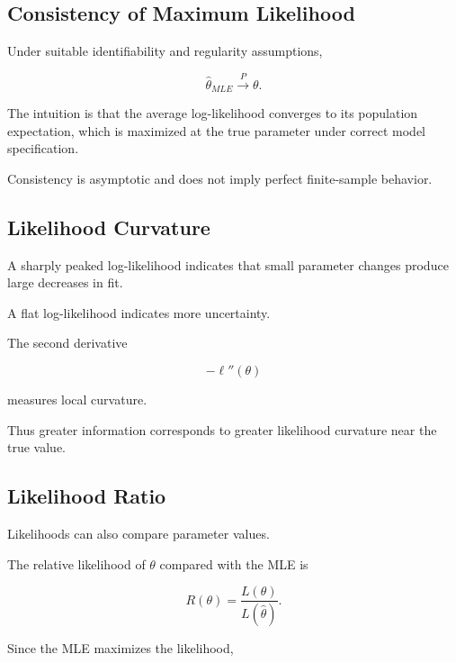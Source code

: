 \subsection{Consistency of Maximum Likelihood}
\label{subsec:mle-consistency}

Under suitable identifiability and regularity assumptions,

\[
\boxed{
\widehat{\theta}_{MLE}
\xrightarrow{P}
\theta.
}
\]

The intuition is that the average log-likelihood converges to its
population expectation, which is maximized at the true parameter under
correct model specification.

Consistency is asymptotic and does not imply perfect finite-sample
behavior.

\subsection{Likelihood Curvature}
\label{subsec:likelihood-curvature}

A sharply peaked log-likelihood indicates that small parameter changes
produce large decreases in fit.

A flat log-likelihood indicates more uncertainty.

The second derivative

\[
-\ell''(\theta)
\]

measures local curvature.

Thus greater information corresponds to greater likelihood curvature
near the true value.

\subsection{Likelihood Ratio}
\label{subsec:likelihood-ratio-estimation}

Likelihoods can also compare parameter values.

The relative likelihood of \(\theta\) compared with the MLE is

\[
\boxed{
R(\theta)
=
\frac{
L(\theta)
}{
L(\widehat{\theta})
}.
}
\]

Since the MLE maximizes the likelihood,

